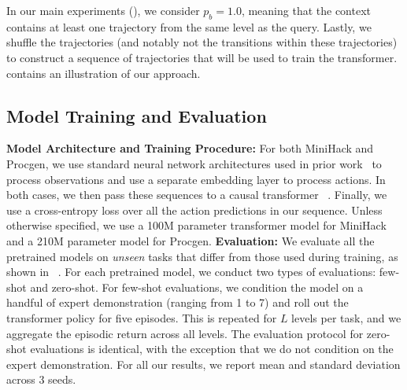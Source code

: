 \documentclass[]{fairmeta}
\begin{document}
In our main experiments (), we consider $p_b=1.0$, meaning that the context contains at least one trajectory from the same level as the query. Lastly, we shuffle the trajectories (and notably not the transitions within these trajectories) to construct a sequence of trajectories that will be used to train the transformer.  contains an illustration of our approach.
\subsection{Model Training and Evaluation}
\label{sec:train_eval}
\textbf{Model Architecture and Training Procedure:}
For both MiniHack and Procgen, we use standard neural network architectures used in prior work~\citep{samvelyan2021minihack, cobbe2020leveraging} to process observations and use a separate embedding layer to process actions.
In both cases, we then pass these sequences to a causal transformer ~\citep{vaswani2017attention}.  Finally, we use a cross-entropy loss over all the action predictions in our sequence. Unless otherwise specified, we use a 100M parameter transformer model for MiniHack and a 210M parameter model for Procgen.
\textbf{Evaluation:} We evaluate all the pretrained models on \textit{unseen} tasks that differ from those used during training, as shown in ~. For each pretrained model, we conduct two types of evaluations: few-shot and zero-shot. For few-shot evaluations, we condition the model on a handful of expert demonstration (ranging from 1 to 7) and roll out the transformer policy for five episodes. This is repeated for $L$ levels per task, and we aggregate the episodic return across all levels. The evaluation protocol for zero-shot evaluations is identical, with the exception that we do not condition on the expert demonstration. For all our results, we report mean and standard deviation across 3 seeds.
\end{document}
